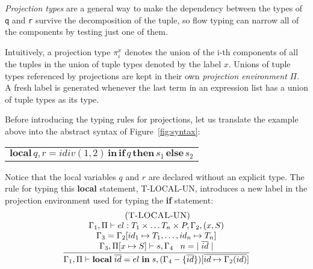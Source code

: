 \documentclass{sigplanconf}
\newcommand{\mylabel}[1]{\; (\textsc{#1})}
\newcommand{\env}{\Gamma}
\newcommand{\penv}{\Pi}
\begin{document}
{\em Projection types}
are a general way to make the dependency between the types
of {\tt q} and {\tt r} survive the decomposition of the tuple,
so flow typing can narrow all of the components by testing
just one of them.

Intuitively, a projection type $\pi_{i}^{x}$ denotes the union of
the i-th components of all the tuples in the union of tuple types
denoted by the label $x$. Unions of tuple types referenced by projections are kept in their own {\em projection environment} $\Pi$. A fresh label is generated whenever the last term
in an expression list has a union of tuple types as its type.

Before introducing the typing rules for projections, let us translate the example above into the abstract syntax of Figure~\ref{fig:syntax}:
\begin{center}
	\begin{tabular}{ll}
		\multicolumn{2}{l}{$\mathbf{local} \, q, r = idiv(1, 2) \, \mathbf{in} \, \mathbf{if} \, q \, \mathbf{then} \, s_1 \, \mathbf{else} \, s_2$}
	\end{tabular}
\end{center}

Notice that the local variables $q$ and $r$ are declared without 
an explicit type. The rule for typing this {\bf local} statement,
{\sc T-LOCAL-UN}, introduces a new label in the projection
environment used for typing the {\bf if} statement:
\[
\begin{array}{c}
\mylabel{T-LOCAL-UN}\\
\dfrac{\begin{array}{c}
	\env_{1}, \penv \vdash el:T_1 \times \ldots T_n \times P, \env_{2}, (x,S)\\
	\env_{3} = \env_{2}[id_{1} \mapsto T_1, \ldots, id_{n} \mapsto T_n]\\
	\env_{3}, \penv[x \mapsto S] \vdash s, \env_{4} \;\;\;
	n = |\;\overline{id}\;|  
	\end{array}}
{\env_{1}, \penv \vdash \mathbf{local} \; \overline{id} = el \; \mathbf{in} \; s, (\env_{4}-\{\overline{id}\})[\overline{id \mapsto \env_2(id)}]}
\end{array}
\]
\end{document}
